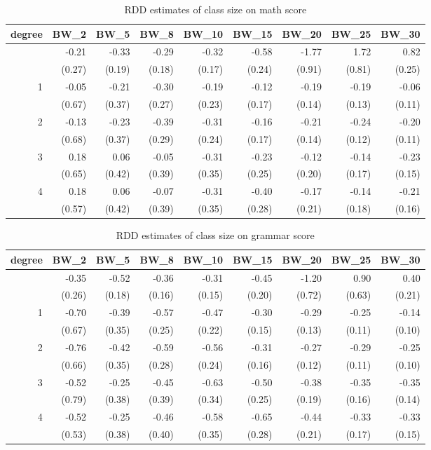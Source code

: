 \documentclass[
  letterpaper,
  DIV=11,
  numbers=noendperiod]{scrartcl}
\begin{document}
\begin{table}
\fontsize{12.0pt}{14.4pt}\selectfont
\caption{RDD estimates of class size on math score}
\begin{tabular*}{\linewidth}{@{\extracolsep{\fill}}rrrrrrrrr}
\toprule
degree & BW\_2 & BW\_5 & BW\_8 & BW\_10 & BW\_15 & BW\_20 & BW\_25 & BW\_30 \\ 
\midrule\addlinespace[2.5pt]
0 & -0.21 & -0.33 & -0.29 & -0.32 & -0.58 & -1.77 & 1.72 & 0.82 \\ 
 & (0.27) & (0.19) & (0.18) & (0.17) & (0.24) & (0.91) & (0.81) & (0.25) \\ 
1 & -0.05 & -0.21 & -0.30 & -0.19 & -0.12 & -0.19 & -0.19 & -0.06 \\ 
 & (0.67) & (0.37) & (0.27) & (0.23) & (0.17) & (0.14) & (0.13) & (0.11) \\ 
2 & -0.13 & -0.23 & -0.39 & -0.31 & -0.16 & -0.21 & -0.24 & -0.20 \\ 
 & (0.68) & (0.37) & (0.29) & (0.24) & (0.17) & (0.14) & (0.12) & (0.11) \\ 
3 & 0.18 & 0.06 & -0.05 & -0.31 & -0.23 & -0.12 & -0.14 & -0.23 \\ 
 & (0.65) & (0.42) & (0.39) & (0.35) & (0.25) & (0.20) & (0.17) & (0.15) \\ 
4 & 0.18 & 0.06 & -0.07 & -0.31 & -0.40 & -0.17 & -0.14 & -0.21 \\ 
 & (0.57) & (0.42) & (0.39) & (0.35) & (0.28) & (0.21) & (0.18) & (0.16) \\ 
\bottomrule
\end{tabular*}
\end{table}

\begin{table}
\fontsize{12.0pt}{14.4pt}\selectfont
\caption{RDD estimates of class size on grammar score}
\begin{tabular*}{\linewidth}{@{\extracolsep{\fill}}rrrrrrrrr}
\toprule
degree & BW\_2 & BW\_5 & BW\_8 & BW\_10 & BW\_15 & BW\_20 & BW\_25 & BW\_30 \\ 
\midrule\addlinespace[2.5pt]
0 & -0.35 & -0.52 & -0.36 & -0.31 & -0.45 & -1.20 & 0.90 & 0.40 \\ 
 & (0.26) & (0.18) & (0.16) & (0.15) & (0.20) & (0.72) & (0.63) & (0.21) \\ 
1 & -0.70 & -0.39 & -0.57 & -0.47 & -0.30 & -0.29 & -0.25 & -0.14 \\ 
 & (0.67) & (0.35) & (0.25) & (0.22) & (0.15) & (0.13) & (0.11) & (0.10) \\ 
2 & -0.76 & -0.42 & -0.59 & -0.56 & -0.31 & -0.27 & -0.29 & -0.25 \\ 
 & (0.66) & (0.35) & (0.28) & (0.24) & (0.16) & (0.12) & (0.11) & (0.10) \\ 
3 & -0.52 & -0.25 & -0.45 & -0.63 & -0.50 & -0.38 & -0.35 & -0.35 \\ 
 & (0.79) & (0.38) & (0.39) & (0.34) & (0.25) & (0.19) & (0.16) & (0.14) \\ 
4 & -0.52 & -0.25 & -0.46 & -0.58 & -0.65 & -0.44 & -0.33 & -0.33 \\ 
 & (0.53) & (0.38) & (0.40) & (0.35) & (0.28) & (0.21) & (0.17) & (0.15) \\ 
\bottomrule
\end{tabular*}
\end{table}
\end{document}
